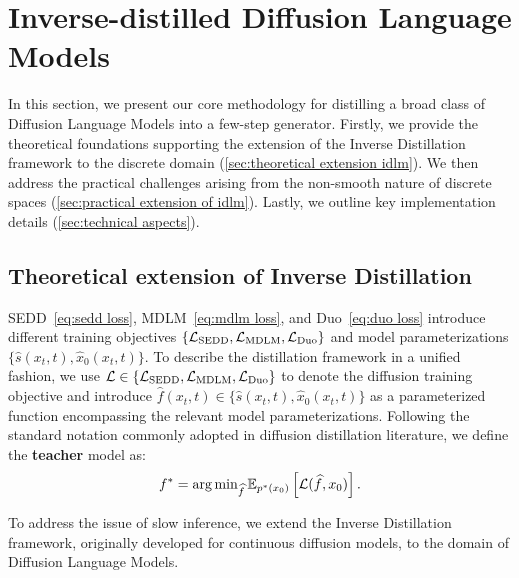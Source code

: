 \vspace{-2mm}
\section{Inverse-distilled Diffusion Language Models}
\vspace{-2mm}
\label{sec:idlm}
  In this section, we present our core methodology for distilling a broad class of Diffusion Language Models into a few-step generator. Firstly, we provide the theoretical foundations supporting the extension of the Inverse Distillation framework to the discrete domain (\wasyparagraph\ref{sec:theoretical extension idlm}). We then address the practical challenges arising from the non-smooth nature of discrete spaces (\wasyparagraph\ref{sec:practical extension of idlm}). Lastly, we outline key implementation details (\wasyparagraph\ref{sec:technical aspects}).

\vspace{-2mm}
\subsection{Theoretical extension of Inverse Distillation}
\vspace{-1mm}
\label{sec:theoretical extension idlm}

  SEDD~\eqref{eq:sedd loss}, MDLM~\eqref{eq:mdlm loss}, and Duo~\eqref{eq:duo loss} introduce different training objectives $\{\mathcal{L}_{\text{SEDD}}, \mathcal{L}_{\text{MDLM}}, \mathcal{L}_{\text{Duo}}\}$ 
  and model parameterizations $\{\widehat{s}(x_t,t), \widehat{x}_0(x_t,t)\}$.
  To describe the distillation framework in a unified fashion, we use $\mathcal{L} \in \{\mathcal{L}_{\text{SEDD}}, \mathcal{L}_{\text{MDLM}}, \mathcal{L}_{\text{Duo}}\}$ to denote the diffusion training objective and introduce $\widehat{f}(x_t,t) \in \{\widehat{s}(x_t,t), \widehat{x}_0(x_t,t)\}$ as a parameterized function encompassing the relevant model parameterizations. Following the standard notation commonly adopted in diffusion distillation literature, we define the \textbf{teacher} model as:
  \begin{equation}
    f^* = \arg\min\nolimits_{\widehat{f}} \EE_{p^*(x_0)} \left[\LC(\widehat{f}, x_0)\right] \nonumber.
    \vspace{-1mm}
  \end{equation}

 \vspace{-0.2mm}
  To address the issue of slow inference, we extend the Inverse Distillation framework, originally developed for continuous diffusion models, to the domain of Diffusion Language Models.

